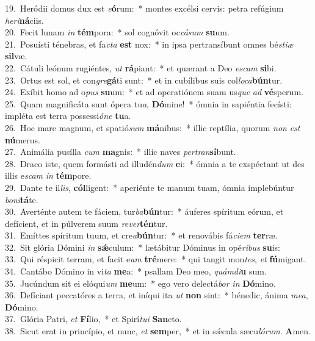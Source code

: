 {19.~}Heródii domus dux est \textit{e}\textbf{ó}rum:~* montes excélsi cervis: petra refúgium \textit{he}\textit{ri}\textbf{ná}ciis.\\
{20.~}Fecit lunam \textit{in} \textbf{tém}pora:~* sol cognóvit oc\textit{cá}\textit{sum} \textbf{su}um.\\
{21.~}Posuísti ténebras, et fa\textit{cta} \textbf{est} nox:~* in ipsa pertransíbunt omnes bé\textit{sti}\textit{æ} \textbf{sil}væ.\\
{22.~}Cátuli leónum rugiéntes, \textit{ut} \textbf{rá}piant:~* et quærant a Deo \textit{e}\textit{scam} \textbf{si}bi.\\
{23.~}Ortus est sol, et con\textit{gre}\textbf{gá}ti sunt:~* et in cubílibus suis col\textit{lo}\textit{ca}\textbf{bún}tur.\\
{24.~}Exíbit homo ad o\textit{pus} \textbf{su}um:~* et ad operatiónem suam us\textit{que} \textit{ad} \textbf{vé}sperum.\\
{25.~}Quam magnificáta sunt ópera tu\textit{a}, \textbf{Dó}mine!~* ómnia in sapiéntia fecísti: impléta est terra possessi\textit{ó}\textit{ne} \textbf{tu}a.\\
{26.~}Hoc mare magnum, et spatió\textit{sum} \textbf{má}nibus:~* illic reptília, quorum \textit{non} \textit{est} \textbf{nú}merus.\\
{27.~}Animália pusílla \textit{cum} \textbf{ma}gnis:~* illic naves \textit{per}\textit{tran}\textbf{sí}bunt.\\
{28.~}Draco iste, quem formásti ad illudén\textit{dum} \textbf{e}i:~* ómnia a te exspéctant ut des illis e\textit{scam} \textit{in} \textbf{tém}pore.\\
{29.~}Dante te il\textit{lis}, \textbf{cól}ligent:~* aperiénte te manum tuam, ómnia implebúntur \textit{bo}\textit{ni}\textbf{tá}te.\\
{30.~}Averténte autem te fáciem, tur\textit{ba}\textbf{bún}tur:~* áuferes spíritum eórum, et defícient, et in púlverem suum \textit{re}\textit{ver}\textbf{tén}tur.\\
{31.~}Emíttes spíritum tuum, et cre\textit{a}\textbf{bún}tur:~* et renovábis fá\textit{ci}\textit{em} \textbf{ter}ræ.\\
{32.~}Sit glória Dómini \textit{in} \textbf{sǽ}culum:~* lætábitur Dóminus in opé\textit{ri}\textit{bus} \textbf{su}is:\\
{33.~}Qui réspicit terram, et facit e\textit{am} \textbf{tré}mere:~* qui tangit mon\textit{tes}, \textit{et} \textbf{fú}migant.\\
{34.~}Cantábo Dómino in vi\textit{ta} \textbf{me}a:~* psallam Deo meo, \textit{quám}\textit{di}\textbf{u} sum.\\
{35.~}Jucúndum sit ei elóqui\textit{um} \textbf{me}um:~* ego vero delectá\textit{bor} \textit{in} \textbf{Dó}mino.\\
{36.~}Defíciant peccatóres a terra, et iníqui ita \textit{ut} \textbf{non} sint:~* bénedic, ánima \textit{me}\textit{a}, \textbf{Dó}mino.\\
{37.~}Glória Patri, \textit{et} \textbf{Fí}lio,~* et Spirí\textit{tu}\textit{i} \textbf{San}cto.\\
{38.~}Sicut erat in princípio, et nunc, \textit{et} \textbf{sem}per,~* et in sǽcula sæcu\textit{ló}\textit{rum}. \textbf{A}men.\\
